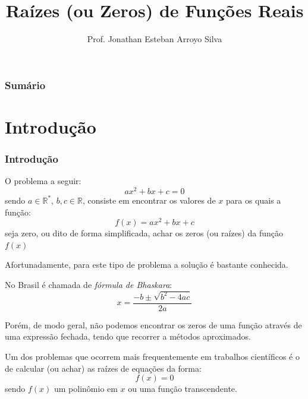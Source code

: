 \documentclass{beamer}
\title{Raízes (ou Zeros) de Funções Reais}
\author
{
	Prof. Jonathan Esteban Arroyo Silva	
}
\institute
{
	Departamento de Ciência da Computação\\
	Universidade Federal de São João del-Rei\\
	\texttt{silva.jea@ufsj.edu.br}
}
\date{}
\theoremstyle{mystyle}
\begin{document}
	
\begin{frame}[plain]
    \maketitle
\end{frame}

\begin{frame}[plain]
	\frametitle{Sumário}
	\tableofcontents
\end{frame}

\section{Introdução}

\begin{frame}
	\frametitle{Introdução}
	O problema a seguir:
	\begin{equation*}
		ax^2 + bx + c = 0
	\end{equation*}
	sendo $ a \in \mathbb{R}^{*} $, $ b,c \in \mathbb{R}$, consiste em encontrar os valores de $ x $ para os quais a função:
	\begin{equation*}
		f(x) = ax^2 + bx + c
	\end{equation*}
	seja zero, ou dito de forma simplificada, achar os zeros (ou raízes) da função $ f(x) $
\end{frame}

\begin{frame}
	Afortunadamente, para este tipo de problema a solução é bastante conhecida.
	
	No Brasil é chamada de \textit{fórmula de Bhaskara}:
	\begin{equation*}
		x = \dfrac{-b \pm \sqrt{b^2 - 4ac}}{2a}
	\end{equation*}

	Porém, de modo geral, não podemos encontrar os zeros de uma função através de uma expressão fechada, tendo que recorrer a métodos aproximados.
\end{frame}

\begin{frame}
	Um dos problemas que ocorrem mais frequentemente em trabalhos científicos é o de calcular (ou achar) as raízes de
	equações da forma:
	\begin{equation*}
		f(x) = 0
	\end{equation*}
	sendo $ f(x) $ um polinômio em $ x $ ou uma função transcendente. 
\end{frame}
\end{document}
